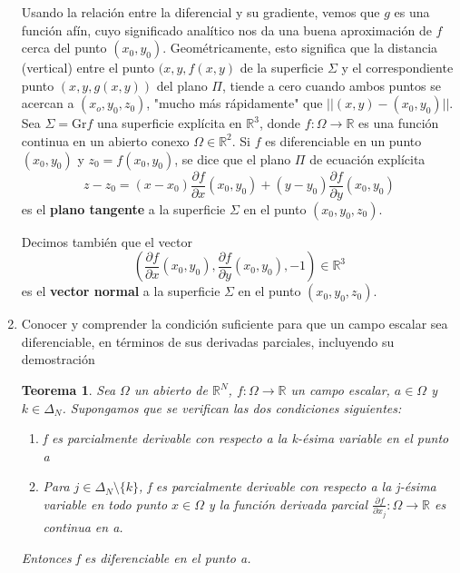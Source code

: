 \documentclass[a4paper, 12pt]{article}
\newtheorem{teorema}{Teorema}
\begin{document}
\begin{enumerate}[label=\textbf{\arabic*}.]
Usando la relación entre la diferencial y su gradiente, vemos que \(g\) es una función afín, cuyo significado analítico nos da una buena aproximación de \(f\) cerca del punto \((x_0, y_0)\). Geométricamente, esto significa que la distancia (vertical) entre el punto \((x,y,f(x,y)\) de la superficie \(\Sigma\) y el correspondiente punto \((x,y,g(x,y))\) del plano \(\Pi\), tiende a cero cuando ambos puntos se acercan a \((x_o, y_0, z_0)\), "mucho más rápidamente" que \(||(x,y) - (x_0,y_0)||\).  \\

Sea \(\Sigma = \text{Gr} f\) una superficie explícita en \(\mathbb{R}^3\), donde \(f: \Omega \to \mathbb{R}\) es una función continua en un abierto conexo \(\Omega \in \mathbb{R}^2\). Si \(f\) es diferenciable en un punto \((x_0, y_0)\) y \(z_0 = f(x_0,y_0)\), se dice que el plano \(\Pi\) de ecuación explícita
\[
	z - z_0 = (x-x_0) \frac{\partial f}{\partial x} (x_0, y_0) + (y- y_0) \frac{\partial f}{\partial y} (x_0, y_0)
\]
es el \textbf{plano tangente} a la superficie \(\Sigma\) en el punto \((x_0, y_0, z_0)\).

Decimos también que el vector
\[
	\left( \frac{\partial f}{\partial x} (x_0, y_0), \frac{\partial f}{\partial y} (x_0, y_0), -1 \right) \in \mathbb{R}^3
\]
es el \textbf{vector normal} a la superficie \(\Sigma\) en el punto \((x_0, y_0, z_0)\).

\bigskip

\item Conocer y comprender la condición suficiente para que un campo escalar sea diferenciable, en términos de sus derivadas parciales, incluyendo su demostración

\begin{teorema} Sea \(\Omega\) un abierto de \(\mathbb{R}^N\), \(f: \Omega \to \mathbb{R}\) un campo escalar, \(a \in \Omega\) y \(k \in \Delta_N\). Supongamos que se verifican las dos condiciones siguientes:
\begin{enumerate}[label=(\textit{\roman*})]
	\item f es parcialmente derivable con respecto a la k-ésima variable en el punto a 
	\item Para \(j \in \Delta_N \setminus \{k\}\), f es parcialmente derivable con respecto a la j-ésima variable en todo punto \(x \in \Omega\) y la función derivada parcial \(\frac{\partial f}{\partial x_j}: \Omega \to \mathbb{R}\) es continua en a.
\end{enumerate}

Entonces f es diferenciable en el punto a.
\end{teorema}


\end{enumerate}
\end{document}
